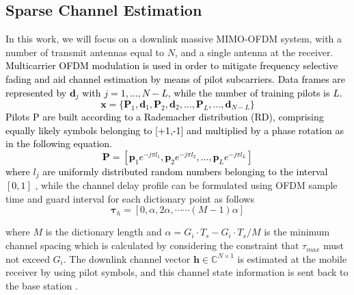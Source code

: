 \subsection{Sparse Channel Estimation}
\label{SparseChannelEstimation}
In this work, we will focus on a downlink massive MIMO-OFDM system, with a number of transmit antennas equal to $N$, and a single antenna at the receiver. \textcolor{black}{Multicarrier OFDM modulation is used in order to mitigate frequency selective fading and aid channel estimation by means of pilot subcarriers. Data frames are represented by $\mathbf{d}_j$ with $j = 1,...,N-L$, while the number of training pilots is $L$.}
\textcolor{black}{
\begin{equation}
\mathbf{x}=\{\mathbf{P}_1 ,\mathbf{d}_1 ,\mathbf{P}_2 ,\mathbf{d}_2,...,\mathbf{P}_L,...,\mathbf{d}_{N-L}\}
\end{equation}
}
\textcolor{black}{
Pilots P are built according to a Rademacher distribution (RD), comprising equally likely symbols belonging to [+1,-1] and multiplied by a phase rotation as in the following equation.
\begin{equation}
\mathbf{P} = [\mathbf{p}_1e^{-j\pi l_1},\mathbf{p}_2e^{-j\pi l_2},...,\mathbf{p}_Le^{-j\pi l_L}]
\end{equation}
where $l_j$ are uniformly distributed random numbers belonging to the interval $[0,1]$
}, while the channel delay profile can be formulated using OFDM sample time and guard interval for each dictionary point as follows
	\begin{equation}
\bm{\tau}_h=[0,\alpha,2\alpha,\cdots \cdots (M-1)\alpha]
	\end{equation}  

where $M$ is the dictionary length and $\alpha=G_i\cdot T_s-G_i\cdot T_s/M$ is the minimum channel spacing which is calculated by considering the constraint that $\tau_{max}$ must not exceed $G_i$. 
The downlink channel vector $\mathbf{h}\in \mathbb{C}^{N\times 1}$ is estimated at the mobile receiver by using pilot symbols, and this channel  state information is sent back to the base station \cite{LearningCS15}.

